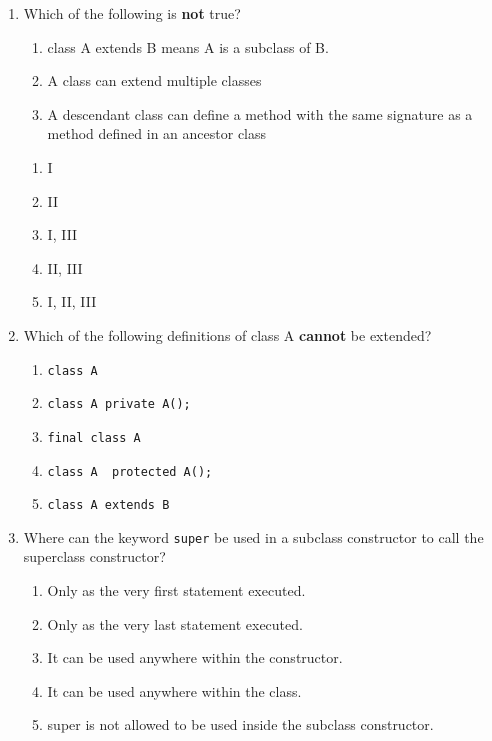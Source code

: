 \documentclass[CS180-S16-FinalExam.tex]{subfiles}
\begin{document}
\begin{enumerate}
\item  Which of the following is \textbf{not} true?
\begin{enumerate}[I]
\item class A extends B means A is a subclass of B.
\item A class can extend multiple classes
\item A descendant class can define a method with the same signature as a method defined in an ancestor class
\end{enumerate}
\begin{enumerate}
\item I
\item II \ifdraft \Ans \fi
\item I, III 
\item II, III 
\item I, II, III
\end{enumerate}

\item  Which of the following definitions of class A \textbf{cannot} be extended?
\begin{enumerate}
\item \texttt{class A{}} 
\item \texttt{class A{ private A(); }}
\item \texttt{final class A {}} \ifdraft \Ans \fi
\item \texttt{class A { protected A(); }}
\item \texttt{class A extends B}
\end{enumerate}

\item  Where can the keyword \texttt{super} be used in a subclass constructor to call the superclass constructor?

\begin{enumerate}
\item Only as the very first statement executed. \ifdraft \Ans \fi
\item Only as the very last statement executed. 
\item It can be used anywhere within the constructor.
\item It can be used anywhere within the class.
\item super is not allowed to be used inside the subclass constructor.
\end{enumerate}

\clearpage


\end{enumerate}
\end{document}
